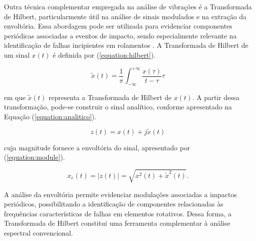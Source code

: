 \documentclass[conference]{IEEEtran}
\begin{document}
Outra técnica complementar empregada na análise de vibrações é a Transformada de Hilbert, particularmente útil na análise de sinais modulados e na extração da envoltória. Essa abordagem pode ser utilizada para evidenciar componentes periódicas associadas a eventos de impacto, sendo especialmente relevante na identificação de falhas incipientes em rolamentos \cite{randall2011vibration}. A Transformada de Hilbert de um sinal $x(t)$ é definida por (\ref{equation:hilbert}).

\begin{equation}
\tilde{x}(t) =
\frac{1}{\pi}
\int_{-\infty}^{+\infty}
\frac{x(\tau)}{t-\tau}\tau
\label{equation:hilbert}
\end{equation}

em que $\tilde{x}(t)$ representa a Transformada de Hilbert de $x(t)$. A partir dessa transformação, pode-se construir o sinal analítico, conforme apresentado na Equação (\ref{equation:analitico}).

\begin{equation}
z(t) = x(t) + j\tilde{x}(t)
\label{equation:analitico}
\end{equation}

cuja magnitude fornece a envoltória do sinal, apresentado por (\ref{equation:module}).

\begin{equation}
x_e(t) = |z(t)|
= \sqrt{x^2(t)+\tilde{x}^2(t)}.
\label{equation:module}
\end{equation}

A análise da envoltória permite evidenciar modulações associadas a impactos periódicos, possibilitando a identificação de componentes relacionadas às frequências características de falhas em elementos rotativos. Dessa forma, a Transformada de Hilbert constitui uma ferramenta complementar à análise espectral convencional.
\end{document}
